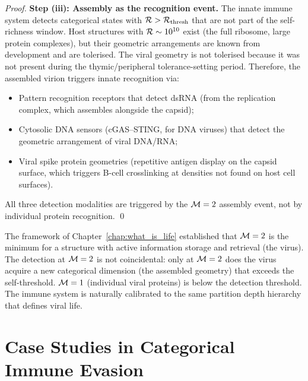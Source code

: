 \begin{proof}
\textbf{Step (iii): Assembly as the recognition event.}
The innate immune system detects categorical states with
$\mathcal{R} > \mathcal{R}_{\mathrm{thresh}}$ that are not part of the self-richness
window. Host structures with $\mathcal{R} \sim 10^{10}$ exist (the full ribosome,
large protein complexes), but their geometric arrangements are known from
development and are tolerised. The viral geometry is not tolerised because it
was not present during the thymic/peripheral tolerance-setting period.
Therefore, the assembled virion triggers innate recognition via:
\begin{itemize}
  \item Pattern recognition receptors that detect dsRNA (from the replication
        complex, which assembles alongside the capsid);
  \item Cytosolic DNA sensors (cGAS--STING, for DNA viruses) that detect the
        geometric arrangement of viral DNA/RNA;
  \item Viral spike protein geometries (repetitive antigen display on the
        capsid surface, which triggers B-cell crosslinking at densities not
        found on host cell surfaces).
\end{itemize}
All three detection modalities are triggered by the $\Depth = 2$ assembly
event, not by individual protein recognition. \qed
\end{proof}

\begin{remark}[$\Depth = 1$ vs. $\Depth = 2$: Why the Distinction Matters]
The framework of Chapter~\ref{chap:what_is_life} established that $\Depth = 2$
is the minimum for a structure with active information storage and retrieval
(the virus). The detection at $\Depth = 2$ is not coincidental: only at
$\Depth = 2$ does the virus acquire a new categorical dimension (the assembled
geometry) that exceeds the self-threshold. $\Depth = 1$ (individual viral
proteins) is below the detection threshold. The immune system is naturally
calibrated to the same partition depth hierarchy that defines viral life.
\end{remark}

\section{Case Studies in Categorical Immune Evasion}
\label{sec:case_studies}

